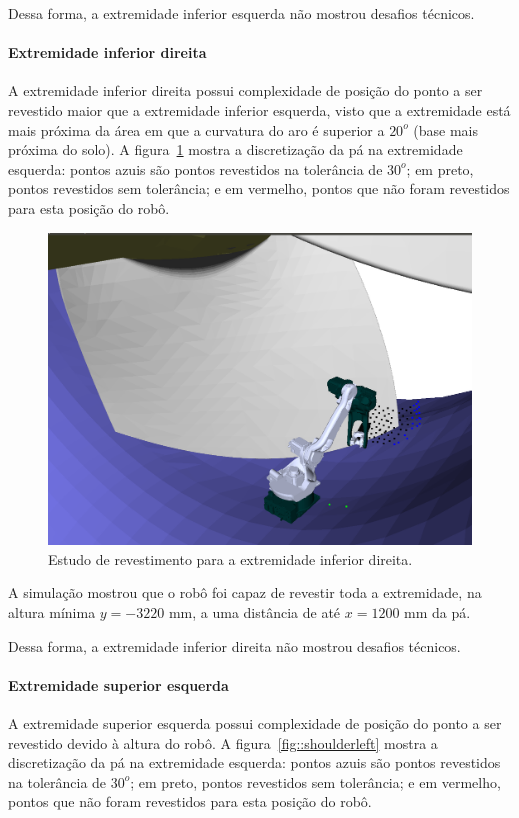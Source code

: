 Dessa forma, a extremidade inferior esquerda não mostrou desafios técnicos.

\paragraph{Extremidade inferior direita}

A extremidade inferior direita possui complexidade de posição do ponto a
ser revestido maior que a extremidade inferior esquerda, visto que a extremidade
está mais próxima da área em que a curvatura do aro é superior a $20^o$ (base
mais próxima do solo). A figura~\ref{fig::footright} mostra a discretização da
pá na extremidade esquerda: pontos azuis são pontos revestidos na tolerância de
$30^o$; em preto, pontos revestidos sem tolerância; e em vermelho, pontos que
não foram revestidos para esta posição do robô.

\begin{figure}[!ht]
	\centering	
	\includegraphics[width=.5\columnwidth]{method/figs/footright.png}
	\caption{Estudo de revestimento para a extremidade inferior direita.}
	\label{fig::footright}
\end{figure}

A simulação mostrou que o robô foi capaz de revestir toda a extremidade, na
altura mínima $y=-3220$ mm, a uma distância de até $x=1200$ mm da pá. 

Dessa forma, a extremidade inferior direita não mostrou desafios técnicos.

\paragraph{Extremidade superior esquerda}\label{superioresquerda}

A extremidade superior esquerda possui complexidade de posição do ponto a
ser revestido devido à altura do robô. A figura~\ref{fig::shoulderleft} mostra
a discretização da pá na extremidade esquerda: pontos azuis são pontos revestidos na tolerância de
$30^o$; em preto, pontos revestidos sem tolerância; e em vermelho, pontos que
não foram revestidos para esta posição do robô.

